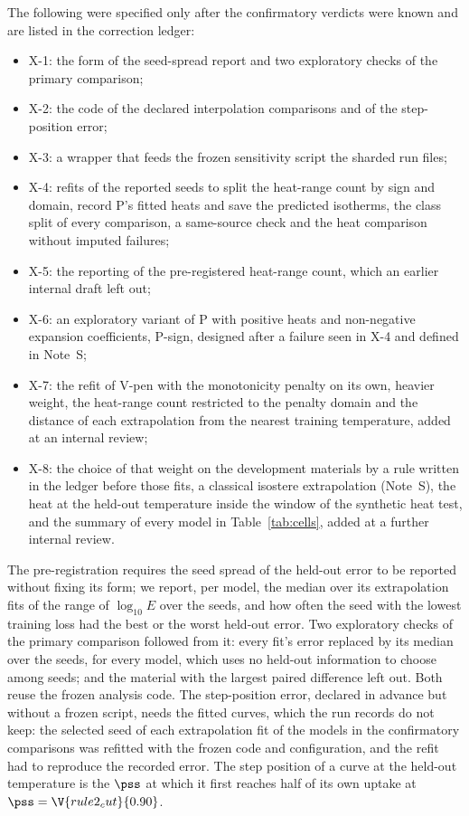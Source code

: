 \documentclass[journal=jcisd8,manuscript=article]{achemso}
\begin{document}
The following were specified only after the confirmatory verdicts were known and are listed in the correction
ledger:
\begin{itemize}
\item X-1: the form of the seed-spread report and two exploratory checks of the primary comparison;
\item X-2: the code of the declared interpolation comparisons and of the step-position error;
\item X-3: a wrapper that feeds the frozen sensitivity script the sharded run files;
\item X-4: refits of the reported seeds to split the heat-range count by sign and domain, record P's fitted heats
and save the predicted isotherms, the class split of every comparison, a same-source check and the heat comparison
without imputed failures;
\item X-5: the reporting of the pre-registered heat-range count, which an earlier internal draft left out;
\item X-6: an exploratory variant of P with positive heats and non-negative expansion coefficients, P-sign, designed
after a failure seen in X-4 and defined in Note~S;
\item X-7: the refit of V-pen with the monotonicity penalty on its own, heavier weight, the heat-range count
restricted to the penalty domain and the distance of each extrapolation from the nearest training temperature,
added at an internal review;
\item X-8: the choice of that weight on the development materials by a rule written in the ledger before those
fits, a classical isostere extrapolation (Note~S), the heat at the held-out temperature inside the window of
the synthetic heat test, and the summary of every model in Table~\ref{tab:cells}, added at a further internal
review.
\end{itemize}
The pre-registration requires the seed spread of the held-out error to be reported
without fixing its form; we report, per model, the median over its extrapolation fits of the range of $\log_{10}E$
over the  seeds, and how often the seed with the lowest training loss had the best or the worst
held-out error. Two exploratory checks of the primary comparison followed from it: every fit's error replaced by its
median over the seeds, for every model, which uses no held-out information to choose among seeds; and the material
with the largest paired difference left out. Both reuse the frozen analysis code. The step-position error, declared
in advance but without a frozen script, needs the fitted curves, which the run records do not keep: the selected
seed of each extrapolation fit of the models in the confirmatory comparisons was refitted with the frozen code and
configuration, and the refit had to reproduce the recorded error. The step position of a curve at the held-out
temperature is the $\pss$ at which it first reaches half of its own uptake at $\pss = \V{rule2_cut}{0.90}$.
\end{document}
